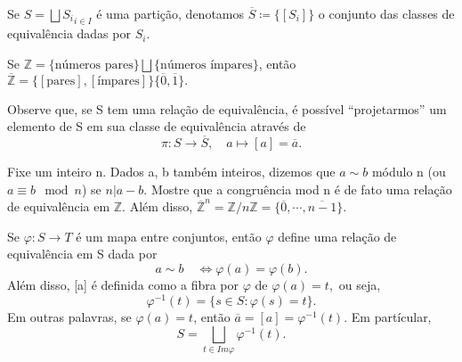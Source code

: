 \documentclass[Algebra/algebra_notes.tex]{subfiles}
\begin{document}
\begin{def*}
	Se $S = \bigsqcup{S_{i}}_{i\in I}$ é uma partição, denotamos $\overline{S}\coloneqq\{[S_{i}]\} $ o conjunto das classes
	de equivalência dadas por $S_{i}.$
\end{def*}
\begin{example*}
	Se $\mathbb{Z}=\{\text{números pares}\}\bigsqcup{\{\text{números ímpares}\}}$, então $\overline{\mathbb{Z}} =\{[\text{pares}], [\text{ímpares}]\}
		\{\overline{0}, \overline{1}\}.$
\end{example*}
Observe que, se S tem uma relação de equivalência, é possível ``projetarmos'' um elemento de S em sua classe de equivalência através de
$$
	\pi:S\rightarrow \overline{S},\quad a\mapsto[a]=\overline{a}.
$$
\begin{example*}
	Fixe um inteiro n. Dados a, b também inteiros, dizemos que $a\sim b$ módulo n (ou $a\equiv b\mod n$) se $n|a-b.$ Mostre que
	a congruência mod n é de fato uma relação de equivalência em $\mathbb{Z}.$ Além disso, $\overline{\mathbb{Z}}^{n} = \mathbb{Z}/n\mathbb{Z} = \{\overline{0}, \cdots, \overline{n-1}\}.$
\end{example*}
\begin{def*}
	Se $\varphi:S\rightarrow T$ é um mapa entre conjuntos, então $\varphi$ define uma relação de equivalência em S dada por
	$$
		a\sim b\quad \Longleftrightarrow \varphi(a) = \varphi(b).
	$$
	Além disso, [a] é definida como a fibra por $\varphi$ de $\varphi(a) = t,$ ou seja,
	$$
		\varphi^{-1}(t) = \{s\in S: \varphi(s) = t\}.
	$$
	Em outras palavras, se $\varphi(a) = t$, então $\overline{a} = [a] = \varphi^{-1}(t).$ Em partícular,
	$$
		S = \bigsqcup_{t\in Im\varphi}{\varphi^{-1}(t)}.
	$$
\end{def*}
\end{document}
